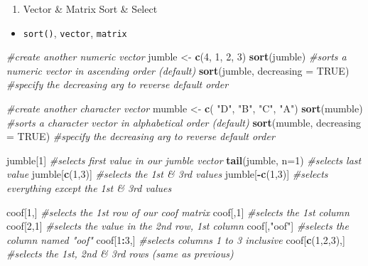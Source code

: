 \documentclass[]{book}
\newenvironment{Shaded}{\begin{snugshade}}{\end{snugshade}}
\newcommand{\CommentTok}[1]{\textcolor[rgb]{0.56,0.35,0.01}{\textit{#1}}}
\newcommand{\DataTypeTok}[1]{\textcolor[rgb]{0.13,0.29,0.53}{#1}}
\newcommand{\DecValTok}[1]{\textcolor[rgb]{0.00,0.00,0.81}{#1}}
\newcommand{\KeywordTok}[1]{\textcolor[rgb]{0.13,0.29,0.53}{\textbf{#1}}}
\newcommand{\NormalTok}[1]{#1}
\newcommand{\OperatorTok}[1]{\textcolor[rgb]{0.81,0.36,0.00}{\textbf{#1}}}
\newcommand{\OtherTok}[1]{\textcolor[rgb]{0.56,0.35,0.01}{#1}}
\newcommand{\StringTok}[1]{\textcolor[rgb]{0.31,0.60,0.02}{#1}}
\providecommand{\tightlist}{%
  \setlength{\itemsep}{0pt}\setlength{\parskip}{0pt}}
\begin{document}
\begin{enumerate}
\def\labelenumi{\arabic{enumi}.}
\setcounter{enumi}{10}
\tightlist
\item
  Vector \& Matrix Sort \& Select
\end{enumerate}

\begin{itemize}
\tightlist
\item
  \texttt{sort()}, \texttt{\textquotesingle{}vector\textquotesingle{}{[}{]}}, \texttt{\textquotesingle{}matrix\textquotesingle{}{[}{]}}
\end{itemize}

\begin{Shaded}
\begin{Highlighting}[]
\CommentTok{#create another numeric vector}
\NormalTok{jumble <-}\StringTok{ }\KeywordTok{c}\NormalTok{(}\DecValTok{4}\NormalTok{, }\DecValTok{1}\NormalTok{, }\DecValTok{2}\NormalTok{, }\DecValTok{3}\NormalTok{)}
\KeywordTok{sort}\NormalTok{(jumble) }\CommentTok{#sorts a numeric vector in ascending order (default)}
\KeywordTok{sort}\NormalTok{(jumble, }\DataTypeTok{decreasing =} \OtherTok{TRUE}\NormalTok{) }\CommentTok{#specify the decreasing arg to reverse default order}

\CommentTok{#create another character vector}
\NormalTok{mumble <-}\StringTok{ }\KeywordTok{c}\NormalTok{( }\StringTok{"D"}\NormalTok{, }\StringTok{"B"}\NormalTok{, }\StringTok{"C"}\NormalTok{, }\StringTok{"A"}\NormalTok{)}
\KeywordTok{sort}\NormalTok{(mumble) }\CommentTok{#sorts a character vector in alphabetical order (default)}
\KeywordTok{sort}\NormalTok{(mumble, }\DataTypeTok{decreasing =} \OtherTok{TRUE}\NormalTok{) }\CommentTok{#specify the decreasing arg to reverse default order}

\NormalTok{jumble[}\DecValTok{1}\NormalTok{] }\CommentTok{#selects first value in our jumble vector}
\KeywordTok{tail}\NormalTok{(jumble, }\DataTypeTok{n=}\DecValTok{1}\NormalTok{) }\CommentTok{#selects last value}
\NormalTok{jumble[}\KeywordTok{c}\NormalTok{(}\DecValTok{1}\NormalTok{,}\DecValTok{3}\NormalTok{)] }\CommentTok{#selects the 1st & 3rd values}
\NormalTok{jumble[}\OperatorTok{-}\KeywordTok{c}\NormalTok{(}\DecValTok{1}\NormalTok{,}\DecValTok{3}\NormalTok{)] }\CommentTok{#selects everything except the 1st & 3rd values}

\NormalTok{coof[}\DecValTok{1}\NormalTok{,] }\CommentTok{#selects the 1st row of our coof matrix}
\NormalTok{coof[,}\DecValTok{1}\NormalTok{] }\CommentTok{#selects the 1st column}
\NormalTok{coof[}\DecValTok{2}\NormalTok{,}\DecValTok{1}\NormalTok{] }\CommentTok{#selects the value in the 2nd row, 1st column}
\NormalTok{coof[,}\StringTok{"oof"}\NormalTok{] }\CommentTok{#selects the column named "oof"}
\NormalTok{coof[}\DecValTok{1}\OperatorTok{:}\DecValTok{3}\NormalTok{,] }\CommentTok{#selects columns 1 to 3 inclusive}
\NormalTok{coof[}\KeywordTok{c}\NormalTok{(}\DecValTok{1}\NormalTok{,}\DecValTok{2}\NormalTok{,}\DecValTok{3}\NormalTok{),] }\CommentTok{#selects the 1st, 2nd & 3rd rows (same as previous)}
\end{Highlighting}
\end{Shaded}
\end{document}
